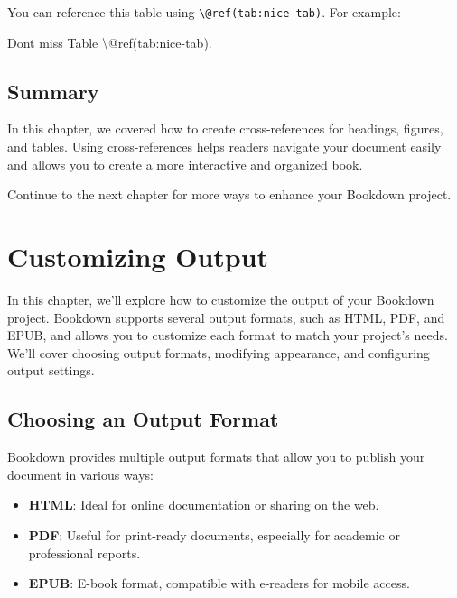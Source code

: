 \documentclass[
]{book}
\newenvironment{Shaded}{\begin{snugshade}}{\end{snugshade}}
\newcommand{\NormalTok}[1]{#1}
\providecommand{\tightlist}{%
  \setlength{\itemsep}{0pt}\setlength{\parskip}{0pt}}
\theoremstyle{definition}
\theoremstyle{definition}
\theoremstyle{definition}
\theoremstyle{definition}
\theoremstyle{remark}
\begin{document}
You can reference this table using \texttt{\textbackslash{}@ref(tab:nice-tab)}. For example:

\begin{Shaded}
\begin{Highlighting}[]
\NormalTok{Don\textquotesingle{}t miss Table \textbackslash{}@ref(tab:nice{-}tab).}
\end{Highlighting}
\end{Shaded}

\section{Summary}\label{summary}

In this chapter, we covered how to create cross-references for headings, figures, and tables. Using cross-references helps readers navigate your document easily and allows you to create a more interactive and organized book.

Continue to the next chapter for more ways to enhance your Bookdown project.

\chapter{Customizing Output}\label{customizing-output}

In this chapter, we'll explore how to customize the output of your Bookdown project. Bookdown supports several output formats, such as HTML, PDF, and EPUB, and allows you to customize each format to match your project's needs. We'll cover choosing output formats, modifying appearance, and configuring output settings.

\section{Choosing an Output Format}\label{choosing-an-output-format}

Bookdown provides multiple output formats that allow you to publish your document in various ways:

\begin{itemize}
\tightlist
\item
  \textbf{HTML}: Ideal for online documentation or sharing on the web.
\item
  \textbf{PDF}: Useful for print-ready documents, especially for academic or professional reports.
\item
  \textbf{EPUB}: E-book format, compatible with e-readers for mobile access.
\end{itemize}
\end{document}
